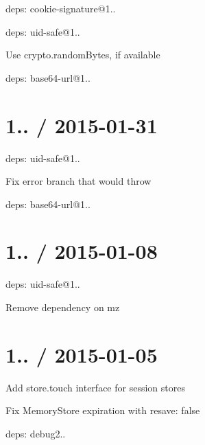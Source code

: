 \begin{DoxyItemize}
\item deps\+: cookie-\/signature@1..
\item deps\+: uid-\/safe@1..
\begin{DoxyItemize}
\item Use {\ttfamily crypto.\+random\+Bytes}, if available
\item deps\+: base64-\/url@1..
\end{DoxyItemize}
\end{DoxyItemize}

\section*{1.. / 2015-\/01-\/31 }


\begin{DoxyItemize}
\item deps\+: uid-\/safe@1..
\begin{DoxyItemize}
\item Fix error branch that would throw
\item deps\+: base64-\/url@1..
\end{DoxyItemize}
\end{DoxyItemize}

\section*{1.. / 2015-\/01-\/08 }


\begin{DoxyItemize}
\item deps\+: uid-\/safe@1..
\begin{DoxyItemize}
\item Remove dependency on {\ttfamily mz}
\end{DoxyItemize}
\end{DoxyItemize}

\section*{1.. / 2015-\/01-\/05 }


\begin{DoxyItemize}
\item Add {\ttfamily store.\+touch} interface for session stores
\item Fix {\ttfamily Memory\+Store} expiration with {\ttfamily resave\+: false}
\item deps\+: debug2..
\end{DoxyItemize}

